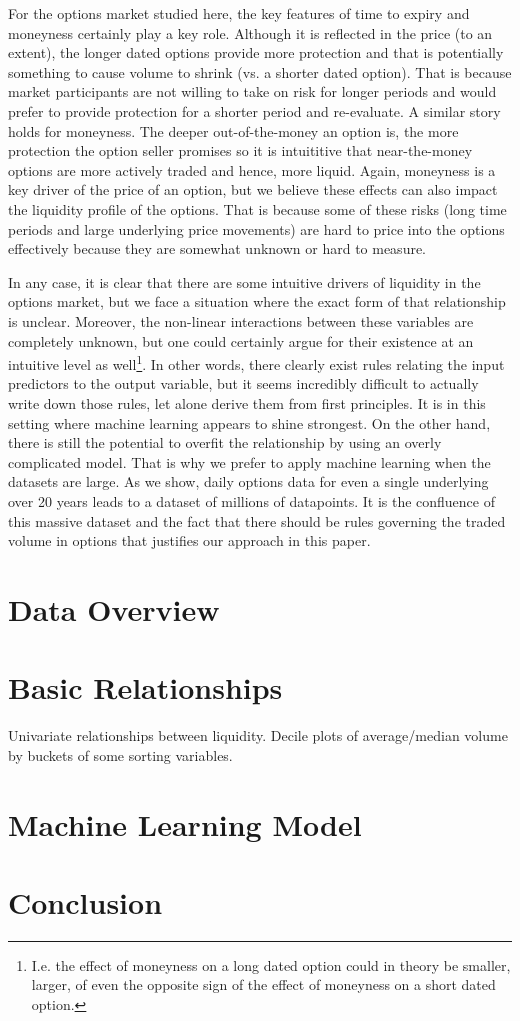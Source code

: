 \documentclass[12pt]{article}
\numberwithin{theorem}{section}
\numberwithin{equation}{section}
\numberwithin{remark}{section}
\numberwithin{definition}{section}
\numberwithin{theorem}{section}
\numberwithin{lemma}{section}
\numberwithin{example}{section}
\begin{document}
For the options market studied here, the key features of time to expiry and moneyness certainly play a key role. Although it is reflected in the price (to an extent), the longer dated options provide more protection and that is potentially something to cause volume to shrink (vs. a shorter dated option). That is because market participants are not willing to take on risk for longer periods and would prefer to provide protection for a shorter period and re-evaluate. A similar story holds for moneyness. The deeper out-of-the-money an option is, the more protection the option seller promises so it is intuititive that near-the-money options are more actively traded and hence, more liquid. Again, moneyness is a key driver of the price of an option, but we believe these effects can also impact the liquidity profile of the options. That is because some of these risks (long time periods and large underlying price movements) are hard to price into the options effectively because they are somewhat unknown or hard to measure. 

In any case, it is clear that there are some intuitive drivers of liquidity in the options market, but we face a situation where the exact form of that relationship is unclear. Moreover, the non-linear interactions between these variables are completely unknown, but one could certainly argue for their existence at an intuitive level as well\footnote{I.e. the effect of moneyness on a long dated option could in theory be smaller, larger, of even the opposite sign of the effect of moneyness on a short dated option.}. In other words, there clearly exist rules relating the input predictors to the output variable, but it seems incredibly difficult to actually write down those rules, let alone derive them from first principles. It is in this setting where machine learning appears to shine strongest. On the other hand, there is still the potential to overfit the relationship by using an overly complicated model. That is why we prefer to apply machine learning when the datasets are large. As we show, daily options data for even a single underlying over 20 years leads to a dataset of millions of datapoints. It is the confluence of this massive dataset and the fact that there should be rules governing the traded volume in options that justifies our approach in this paper. 

\section{Data Overview}


\section{Basic Relationships}
Univariate relationships between liquidity. Decile plots of average/median volume by buckets of some sorting variables. 

\section{Machine Learning Model}


\section{Conclusion}
\end{document}
